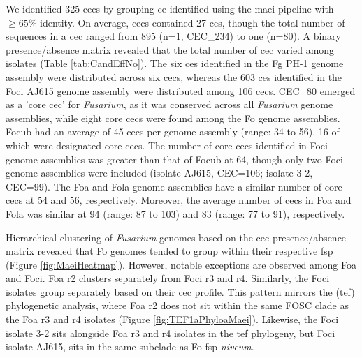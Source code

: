 We identified 325 \acfp{cec} by grouping \ac{ce} identified using the \ac{maei} pipeline with $\geq65\% $ identity. On average, \acp{cec} contained 27 \acp{ce}, though the total number of sequences in a \ac{cec} ranged from 895 (n=1, CEC\_234) to one (n=80). A binary presence/absence matrix revealed that the total number of \ac{cec} varied among isolates (Table \ref{tab:CandEffNo}). The six \acp{ce} identified in the \ac{Fg} PH-1 genome assembly were distributed across six \acp{cec}, whereas the 603 \acp{ce} identified in the \ac{Foci} AJ615 genome assembly were distributed among 106 \acp{cec}. CEC\_80 emerged as a 'core \ac{cec}' for \textit{Fusarium}, as it was conserved across all \textit{Fusarium} genome assemblies, while eight core \acp{cec} were found among the \ac{Fo} genome assemblies. \ac{Focub} had an average of 45 \acp{cec} per genome assembly (range: 34 to 56), 16 of which were designated core \acp{cec}. The number of core \acp{cec} identified in \ac{Foci} genome assemblies was greater than that of \ac{Focub} at 64, though only two \ac{Foci} genome assemblies were included (isolate AJ615, CEC=106; isolate 3-2, CEC=99). The \ac{Foa} and \ac{Fola} genome assemblies have a similar number of core \acp{cec} at 54 and 56, respectively. Moreover, the average number of \acp{cec} in \ac{Foa} and \ac{Fola} was similar at  94 (range: 87 to 103) and 83 (range: 77 to 91), respectively.

Hierarchical clustering of \textit{Fusarium} genomes based on the \ac{cec} presence/absence matrix revealed that \ac{Fo} genomes tended to group within their respective \ac{fsp} (Figure \ref{fig:MaeiHeatmap}). However, notable exceptions are observed among \ac{Foa} and \ac{Foci}. \ac{Foa} \ac{r2} clusters separately from \ac{Foci} \ac{r3} and \ac{r4}. Similarly, the \ac{Foci} isolates group separately based on their \ac{cec} profile. This pattern mirrors the (\ac{tef}) phylogenetic analysis, where \ac{Foa} \ac{r2} does not sit within the same \ac{FOSC} clade as the \ac{Foa} \ac{r3} and \ac{r4} isolates  (Figure \ref{fig:TEF1aPhyloaMaei}). Likewise, the \ac{Foci} isolate 3-2 sits alongside \ac{Foa} \ac{r3} and \ac{r4} isolates in the \ac{tef} phylogeny, but \ac{Foci} isolate AJ615, sits in the same subclade as \ac{Fo} \ac{fsp} \textit{niveum}. 


